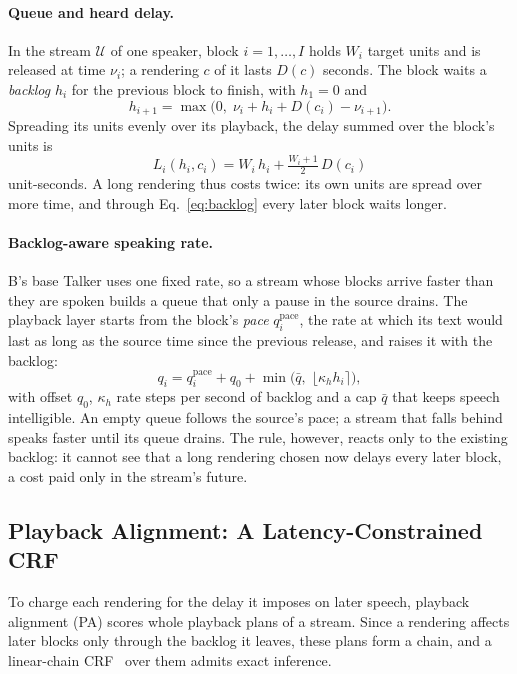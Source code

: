 \paragraph{Queue and heard delay.} In the stream $\mathcal{U}$ of one speaker, block $i=1,\dots,I$ holds $W_i$ target
units and is released at time $\nu_i$; a rendering $c$ of it lasts $D(c)$ seconds. The block waits a \emph{backlog}
$h_i$ for the previous block to finish, with $h_1=0$ and
\begin{equation}
h_{i+1}=\max\big(0,\;\nu_i+h_i+D(c_i)-\nu_{i+1}\big).
\label{eq:backlog}
\end{equation}
Spreading its units evenly over its playback, the delay summed over the block's units is
\begin{equation}
L_i(h_i,c_i)=W_i\,h_i+\tfrac{W_i+1}{2}\,D(c_i)
\label{eq:lat}
\end{equation}
unit-seconds. A long rendering thus costs twice: its own units are spread over more time, and through
Eq.~\eqref{eq:backlog} every later block waits longer.

\paragraph{Backlog-aware speaking rate.} B's base Talker uses one fixed rate, so a stream whose blocks arrive faster
than they are spoken builds a queue that only a pause in the source drains. The playback layer starts from the block's
\emph{pace} $q^{\mathrm{pace}}_i$, the rate at which its text would last as long as the source time since the previous
release, and raises it with the backlog:
\begin{equation}
q_i=q^{\mathrm{pace}}_i+q_0+\min\big(\bar q,\;\lfloor\kappa_h h_i\rceil\big),
\label{eq:rate}
\end{equation}
with offset $q_0$, $\kappa_h$ rate steps per second of backlog and a cap $\bar q$ that keeps speech intelligible. An
empty queue follows the source's pace; a stream that falls behind speaks faster until its queue drains. The rule,
however, reacts only to the existing backlog: it cannot see that a long rendering chosen now delays every later block,
a cost paid only in the stream's future.

\subsection{Playback Alignment: A Latency-Constrained CRF}
\label{sec:method-plem}

To charge each rendering for the delay it imposes on later speech, playback alignment (PA) scores whole playback
plans of a stream. Since a rendering affects later blocks only through the backlog it leaves, these plans form a chain,
and a linear-chain CRF~\citep{lafferty2001crf} over them admits exact inference.

